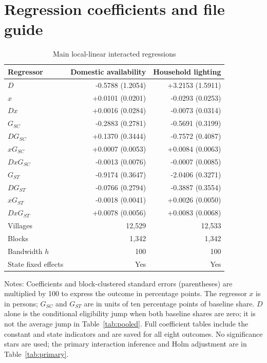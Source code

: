 \documentclass[11pt,a4paper]{article}
\begin{document}
\section{Regression coefficients and file guide}
\begin{table}[htbp]\centering\small
\caption{Main local-linear interacted regressions}
\label{tab:coefficients}
\begin{tabular}{lrr}\toprule
Regressor & Domestic availability & Household lighting\\\midrule
$D$ & -0.5788 (1.2054) & +3.2153 (1.5911) \\
$x$ & +0.0101 (0.0201) & -0.0293 (0.0253) \\
$D x$ & +0.0016 (0.0284) & -0.0073 (0.0314) \\
$G_{SC}$ & -0.2883 (0.2781) & -0.5691 (0.3199) \\
$D G_{SC}$ & +0.1370 (0.3444) & -0.7572 (0.4087) \\
$x G_{SC}$ & +0.0007 (0.0053) & +0.0084 (0.0063) \\
$D x G_{SC}$ & -0.0013 (0.0076) & -0.0007 (0.0085) \\
$G_{ST}$ & -0.9174 (0.3647) & -2.0406 (0.3271) \\
$D G_{ST}$ & -0.0766 (0.2794) & -0.3887 (0.3554) \\
$x G_{ST}$ & -0.0018 (0.0041) & +0.0026 (0.0050) \\
$D x G_{ST}$ & +0.0078 (0.0056) & +0.0083 (0.0068) \\
\midrule
Villages & 12,529 & 12,533\\
Blocks & 1,342 & 1,342\\
Bandwidth $h$ & 100 & 100\\
State fixed effects & Yes & Yes\\
\bottomrule\end{tabular}
\par\smallskip\footnotesize\raggedright
Notes: Coefficients and block-clustered standard errors (parentheses) are multiplied by 100 to express the outcome in percentage points. The regressor $x$ is in persons; $G_{SC}$ and $G_{ST}$ are in units of ten percentage points of baseline share. $D$ alone is the conditional eligibility jump when both baseline shares are zero; it is not the average jump in Table~\ref{tab:pooled}. Full coefficient tables include the constant and state indicators and are saved for all eight outcomes. No significance stars are used; the primary interaction inference and Holm adjustment are in Table~\ref{tab:primary}.
\end{table}
\end{document}
